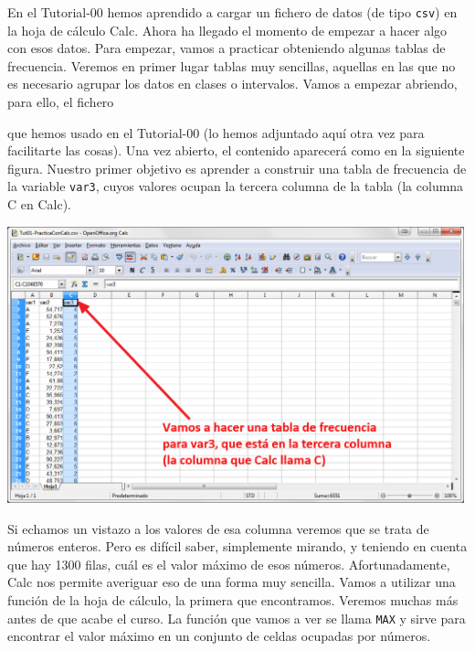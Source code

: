 \documentclass[10pt,a4paper]{article}\usepackage[]{graphicx}\usepackage[]{color}
\newcounter {cont01}
\begin{document}
En el Tutorial-00 hemos aprendido a cargar un fichero de datos (de tipo {\tt csv}) en la hoja de cálculo Calc. Ahora ha llegado el momento de empezar a hacer algo con esos datos. Para empezar, vamos a practicar obteniendo algunas tablas de frecuencia. Veremos en primer lugar tablas muy sencillas, aquellas en las que no es necesario agrupar los datos en clases o intervalos. Vamos a empezar abriendo, para ello, el fichero
\begin{center}
\end{center}
que hemos usado en el Tutorial-00 (lo hemos adjuntado aquí otra vez para facilitarte las cosas).
%
Una vez abierto, el contenido aparecerá como en la siguiente figura. Nuestro primer objetivo es aprender a construir una tabla de frecuencia de la variable {\tt var3}, cuyos valores ocupan la tercera columna de la tabla (la columna C en Calc).
    \begin{center}
    \includegraphics[height=8cm]{../fig/Tut01-Calc-tablaFrec-01.png}
    \end{center}
Si echamos un vistazo a los valores de esa columna veremos que se trata de números enteros. Pero es difícil saber, simplemente mirando, y teniendo en cuenta que hay 1300 filas, cuál es el valor máximo de esos números. Afortunadamente, Calc nos permite averiguar eso de una forma muy sencilla.
Vamos a utilizar una {\sf función} de la hoja de cálculo, la primera que encontramos. Veremos muchas más antes de que acabe el curso. La función que vamos a ver se llama {\tt MAX} y sirve para encontrar el valor máximo en un conjunto de celdas ocupadas por números.\\
\end{document}
